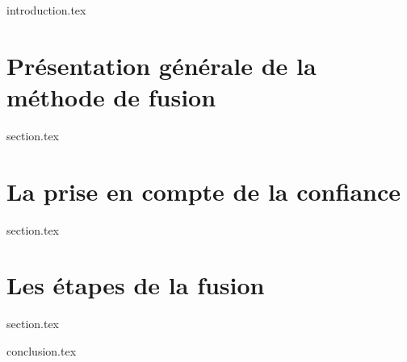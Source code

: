 %

\chaptertoc{}

\label{chap:08-int}
{introduction.tex}

\section{Présentation générale de la méthode de fusion}
\label{chap:08-sec1}
{section.tex}

\section{La prise en compte de la confiance}
\label{chap:08-sec2}
{section.tex}

\section{Les étapes de la fusion}
\label{chap:08-sec3}
{section.tex}

\label{chap:08-cnc}
{conclusion.tex}

